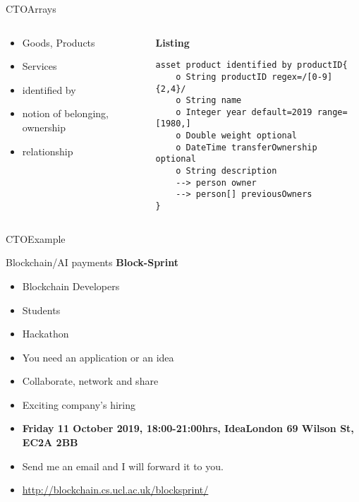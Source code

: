 \documentclass[pdf,table]{beamer}
\begin{document}
\begin{frame}[fragile]{CTO}{Arrays}
	\begin{columns}[T]
		\begin{column}{0.48\textwidth}
			\begin{itemize}
				\item Goods, Products
				\item Services 
				\item identified by
				\item notion of belonging, ownership 
				\item relationship 
			\end{itemize}	
		\end{column}
		\begin{column}{0.48\textwidth}
			{\bf Listing}
\begin{lstlisting}[language=CTO]
asset product identified by productID{
	o String productID regex=/[0-9]{2,4}/
	o String name 
	o Integer year default=2019 range=[1980,]
	o Double weight optional
	o DateTime transferOwnership optional
	o String description 
	--> person owner
	--> person[] previousOwners
}
			\end{lstlisting}
		\end{column}
	\end{columns}	
\end{frame}







\begin{frame}{CTO}{Example}
	
	
\end{frame}

\begin{frame}{Blockchain/AI payments}
	\textbf{Block-Sprint}
	\begin{itemize}
		\item Blockchain Developers
		\item Students
		\item Hackathon
		\item You need an application or an idea
		\item Collaborate, network and share
		\item Exciting company's hiring
		\item \textbf{Friday 11 October 2019, 18:00-21:00hrs, IdeaLondon 69 Wilson St, EC2A 2BB}
		\item Send me an email and I will forward it to you.
		\item \url{http://blockchain.cs.ucl.ac.uk/blocksprint/}
	\end{itemize}
\end{frame}
\end{document}
